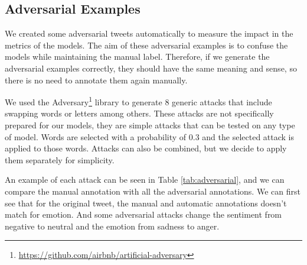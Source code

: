 \documentclass[11pt,a4paper]{article}
\begin{document}
\subsection{Adversarial Examples}

We created some adversarial tweets automatically to measure the impact in the metrics of the models. The aim of these adversarial examples is to confuse the models while maintaining the manual label. Therefore, if we generate the adversarial examples correctly, they should have the same meaning and sense, so there is no need to annotate them again manually. 

We used the Adversary\footnote{\url{https://github.com/airbnb/artificial-adversary}} library to generate 8 generic attacks that include swapping words or letters among others. These attacks are not specifically prepared for our models, they are simple attacks that can be tested on any type of model. Words are selected with a probability of 0.3 and the selected attack is applied to those words. Attacks can also be combined, but we decide to apply them separately for simplicity. 

An example of each attack can be seen in Table \ref{tab:adversarial}, and we can compare the manual annotation with all the adversarial annotations. We can first see that for the original tweet, the manual and automatic annotations doesn't match for emotion. And some adversarial attacks change the sentiment from negative to neutral and the emotion from sadness to anger.
\end{document}

